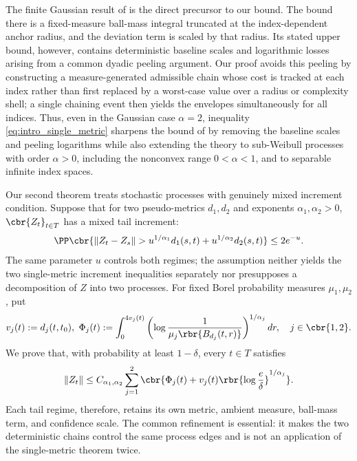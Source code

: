 \documentclass[11pt]{article}
\begin{document}
The finite Gaussian result of \citet{xu2026} is the direct precursor to our bound. The bound there is a fixed-measure
ball-mass integral truncated at the index-dependent anchor radius, and the
deviation term is scaled by that radius. Its stated upper bound, however,
contains deterministic baseline scales and logarithmic losses arising from
a common dyadic peeling argument. Our proof avoids this peeling by
constructing a measure-generated admissible chain whose cost is tracked at
each index rather than first replaced by a worst-case value over a radius or
complexity shell; a single chaining event then yields the envelopes
simultaneously for all indices. Thus, even in the Gaussian case
$\alpha=2$, inequality \eqref{eq:intro_single_metric} sharpens the bound of
\citet{xu2026} by removing the baseline scales and peeling logarithms while
also extending the theory to sub-Weibull processes with order $\alpha>0$, including
the nonconvex range $0<\alpha<1$, and to separable infinite index
spaces.

Our second theorem treats stochastic processes with genuinely mixed increment condition. Suppose that
for two pseudo-metrics $d_1,d_2$ and exponents
$\alpha_1,\alpha_2>0$, $\cbr{Z_t}_{t\in T}$ has a mixed tail increment:
\begin{align*}
\PP\cbr{
\|Z_t-Z_s\|>
u^{1/\alpha_1}d_1(s,t)
+u^{1/\alpha_2}d_2(s,t)
}
\le2e^{-u}.
\end{align*}
The same parameter $u$ controls both regimes; the assumption neither yields
the two single-metric increment inequalities separately nor presupposes a
decomposition of $Z$ into two processes.  For fixed Borel probability
measures $\mu_1,\mu_2$, put
\begin{align*}
v_j(t):=d_j(t,t_0),\ 
\Phi_j(t)
:=
\int_0^{4v_j(t)}
\left(
\log\frac{1}{\mu_j\rbr{B_{d_j}(t,r)}}
\right)^{1/\alpha_j}dr,
\quad j\in\cbr{1,2}.
\end{align*}
We prove that, with probability at least $1-\delta$, every
$t\in T$ satisfies
\begin{align}
\|Z_t\|
\le
C_{\alpha_1,\alpha_2}
\sum_{j=1}^2
\cbr{
\Phi_j(t)
+v_j(t)\rbr{\log\frac{e}{\delta}}^{1/\alpha_j}
}.
\label{eq:intro_mixed_metric}
\end{align}
Each tail regime, therefore, retains its own metric, ambient measure,
ball-mass term, and confidence scale.
The common refinement is essential: it makes the two deterministic chains
control the same process edges and is not an application of the
single-metric theorem twice.
\end{document}
